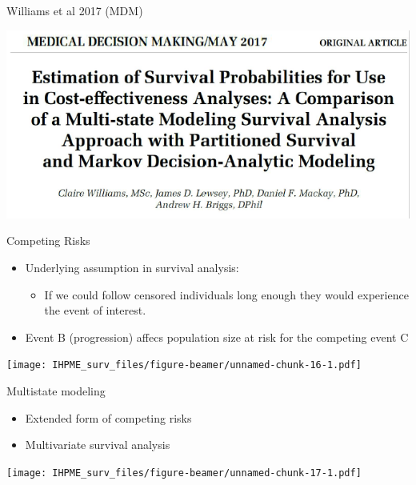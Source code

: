 \documentclass[
  ignorenonframetext,
]{beamer}
\providecommand{\tightlist}{%
  \setlength{\itemsep}{0pt}\setlength{\parskip}{0pt}}
\begin{document}
\begin{frame}

Williams et al 2017 (MDM)

\includegraphics[width=1\linewidth]{figures/williams2017}

\end{frame}

\begin{frame}{Competing Risks}
\protect\hypertarget{competing-risks}{}

\begin{itemize}
\tightlist
\item
  Underlying assumption in survival analysis:

  \begin{itemize}
  \tightlist
  \item
    If we could follow censored individuals long enough they would
    experience the event of interest.
  \end{itemize}
\item
  Event B (progression) affecs population size at risk for the competing
  event C
\end{itemize}

\end{frame}

\begin{frame}

\texttt{[image: IHPME\_surv\_files/figure-beamer/unnamed-chunk-16-1.pdf]}

\end{frame}

\begin{frame}{Multistate modeling}
\protect\hypertarget{multistate-modeling}{}

\begin{itemize}
\tightlist
\item
  Extended form of competing risks
\item
  Multivariate survival analysis
\end{itemize}

\texttt{[image: IHPME\_surv\_files/figure-beamer/unnamed-chunk-17-1.pdf]}

\end{frame}
\end{document}
